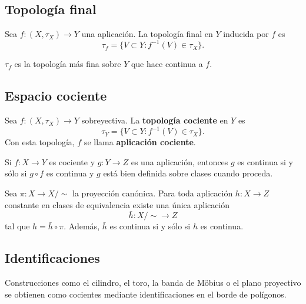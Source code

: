 \subsection{Topología final}

\begin{definición}
    Sea $f:(X,\tau_X)\to Y$ una aplicación. La topología final en $Y$ inducida por $f$ es
    $$\tau_f=\{V\subset Y: f^{-1}(V)\in\tau_X\}.$$
\end{definición}

\begin{proposición}
    $\tau_f$ es la topología más fina sobre $Y$ que hace continua a $f$.
\end{proposición}


\subsection{Espacio cociente}

\begin{definición}
    Sea $f:(X,\tau_X)\to Y$ sobreyectiva. La \textbf{topología cociente} en $Y$ es
    $$\tau_Y=\{V\subset Y: f^{-1}(V)\in\tau_X\}.$$
    Con esta topología, $f$ se llama \textbf{aplicación cociente}.
\end{definición}

\begin{proposición}
    Si $f:X\to Y$ es cociente y $g:Y\to Z$ es una aplicación, entonces $g$ es continua si y sólo si $g\circ f$ es continua y $g$ está bien definida sobre clases cuando proceda.
\end{proposición}

\begin{proposición}
    Sea $\pi:X\to X/\sim$ la proyección canónica. Para toda aplicación $h:X\to Z$ constante en clases de equivalencia existe una única aplicación
    $$\bar h:X/\sim\to Z$$
    tal que $h=\bar h\circ \pi$. Además, $\bar h$ es continua si y sólo si $h$ es continua.
\end{proposición}

\subsection{Identificaciones}

\begin{observación}
    Construcciones como el cilindro, el toro, la banda de Möbius o el plano proyectivo se obtienen como cocientes mediante identificaciones en el borde de polígonos.
\end{observación}

